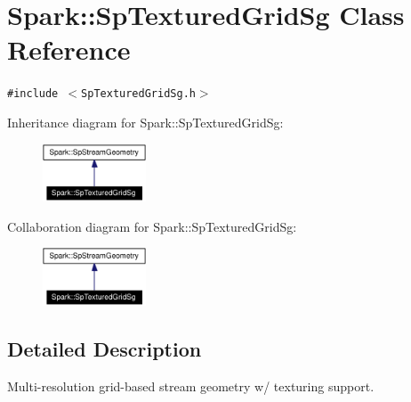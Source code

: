 \section{Spark::Sp\-Textured\-Grid\-Sg Class Reference}
\label{classSpark_1_1SpTexturedGridSg}
{\tt \#include $<$Sp\-Textured\-Grid\-Sg.h$>$}

Inheritance diagram for Spark::Sp\-Textured\-Grid\-Sg:\begin{figure}[H]
\begin{center}
\leavevmode
\includegraphics[width=87pt]{classSpark_1_1SpTexturedGridSg__inherit__graph}
\end{center}
\end{figure}
Collaboration diagram for Spark::Sp\-Textured\-Grid\-Sg:\begin{figure}[H]
\begin{center}
\leavevmode
\includegraphics[width=87pt]{classSpark_1_1SpTexturedGridSg__coll__graph}
\end{center}
\end{figure}


\subsection{Detailed Description}
Multi-resolution grid-based stream geometry w/ texturing support. 

